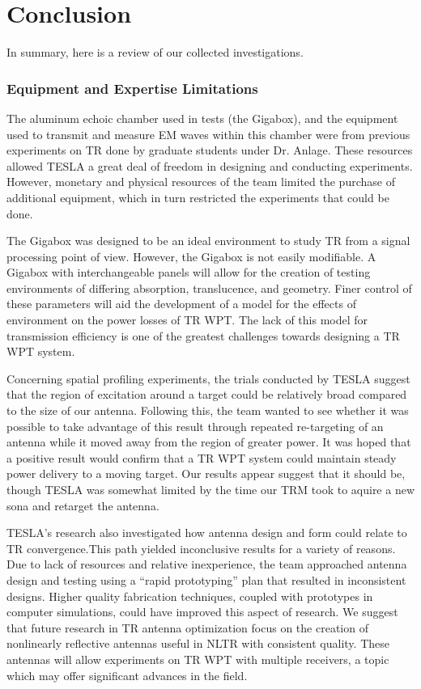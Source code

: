 \chapter{Conclusion}

\label{ch:conclusion}

In summary, here is a review of our collected investigations.

\subsection{Equipment and Expertise Limitations}

The aluminum echoic chamber used in tests (the Gigabox), and the equipment used to transmit and measure EM waves within this chamber were from previous experiments on TR done by graduate students under Dr. Anlage.  These resources allowed TESLA a great deal of freedom in designing and conducting experiments.  However, monetary and physical resources of the team limited the purchase of additional equipment, which in turn restricted the experiments that could be done. 

The Gigabox was designed to be an ideal environment to study TR from a signal processing point of view. However, the Gigabox is not easily modifiable. A Gigabox with interchangeable panels will allow for the creation of testing environments of differing absorption, translucence, and geometry. Finer control of these parameters will aid the development of a model for the effects of environment on the power losses of TR WPT. The lack of this model for transmission efficiency is one of the greatest challenges towards designing a TR WPT system. 

Concerning spatial profiling experiments, the trials conducted by TESLA suggest that the region of excitation around a target could be relatively broad compared to the size of our antenna. Following this, the team wanted to see whether it was possible to take advantage of this result through repeated re-targeting of an antenna while it moved away from the region of greater power. It was hoped that a positive result  would confirm that a TR WPT system could maintain steady power delivery to a moving target. Our results appear suggest that it should be, though TESLA was somewhat limited by the time our TRM took to aquire a new sona and retarget the antenna.

TESLA's research also investigated how antenna design and form could relate to TR convergence.This path yielded inconclusive results for a variety of reasons. Due to lack of resources and relative inexperience, the team approached antenna design and testing using a ``rapid prototyping'' plan that resulted in inconsistent designs. Higher quality fabrication techniques, coupled with prototypes in computer simulations, could have improved this aspect of research.  We suggest that future research in TR antenna optimization focus on the creation of nonlinearly reflective antennas useful in NLTR with consistent quality.  These antennas will allow experiments on TR WPT with multiple receivers, a topic which may offer significant advances in the field.

